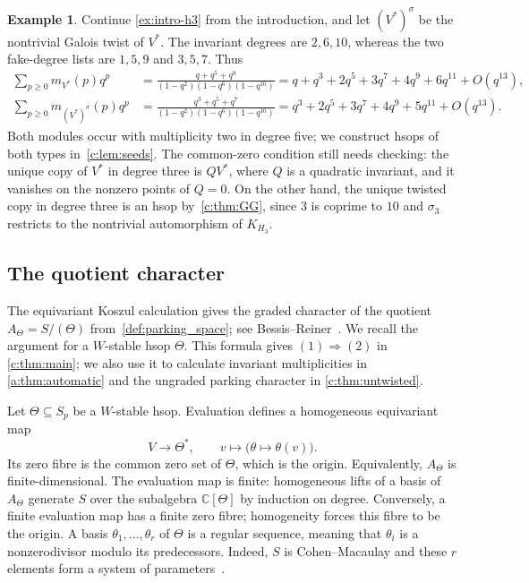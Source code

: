 \documentclass[10pt,a4paper]{amsart}
\theoremstyle{definition}
\newtheorem{example}[theorem]{Example}
\newcommand{\C}{\mathbb C}\newcommand{\Q}{\mathbb Q}
\begin{document}
\begin{example}\label{ex:h3-multiplicity}
Continue \cref{ex:intro-h3} from the introduction, and let
$(V^*)^\sigma$ be the nontrivial Galois twist of $V^*$. The invariant degrees are
$2,6,10$, whereas the two fake-degree lists are $1,5,9$ and $3,5,7$.
Thus
\begin{align*}
 \sum_{p\ge0}m_{V^*}(p)q^p
 &=\frac{q+q^5+q^9}{(1-q^2)(1-q^6)(1-q^{10})}
   =q+q^3+2q^5+3q^7+4q^9+6q^{11}+O(q^{13}),\\
 \sum_{p\ge0}m_{(V^*)^\sigma}(p)q^p
 &=\frac{q^3+q^5+q^7}{(1-q^2)(1-q^6)(1-q^{10})}
   =q^3+2q^5+3q^7+4q^9+5q^{11}+O(q^{13}).
\end{align*}
Both modules occur with multiplicity two in degree five; we construct
hsops of both types in~\cref{c:lem:seeds}. The common-zero condition
still needs checking: the unique copy of $V^*$ in degree three is
$QV^*$, where $Q$ is a quadratic invariant, and it vanishes on the
nonzero points of $Q=0$. On the other hand, the unique twisted copy in degree three is
an hsop by~\cref{c:thm:GG}, since $3$ is coprime to $10$ and
$\sigma_3$ restricts to the nontrivial automorphism of $K_{H_3}$.
\end{example}

\subsection{The quotient character}\label{b:sec:quotient-character}

The equivariant Koszul calculation gives the graded character
of the quotient $A_\Theta=S/(\Theta)$ from~\cref{def:parking_space}; see
Bessis--Reiner~\cite[Proposition~4.2 and its proof]{BR}.
We recall the argument for a $W$-stable hsop $\Theta$.
This formula gives
$(1)\Rightarrow(2)$ in \cref{c:thm:main}; we also use it to calculate
invariant multiplicities in \cref{a:thm:automatic} and the ungraded
parking character in \cref{c:thm:untwisted}.

Let $\Theta\subseteq S_p$ be a $W$-stable hsop. Evaluation defines a
homogeneous equivariant map
\[
 V\longrightarrow\Theta^*,\qquad
 v\longmapsto\bigl(\theta\longmapsto\theta(v)\bigr).
\]
Its zero fibre is the common zero set of $\Theta$, which is the
origin. Equivalently, $A_\Theta$ is finite-dimensional. The evaluation
map is finite: homogeneous lifts of a basis of $A_\Theta$ generate
$S$ over the subalgebra $\C[\Theta]$ by induction on degree.
Conversely, a finite evaluation map has a finite zero fibre; homogeneity
forces this fibre to be the origin.
A basis $\theta_1,\ldots,\theta_r$ of $\Theta$ is a regular sequence,
meaning that $\theta_i$ is a nonzerodivisor modulo its predecessors.
Indeed, $S$ is Cohen--Macaulay and these $r$ elements form a system
of parameters~\cite[Lemmas~10.104.2 and~10.104.7]{Stacks}.
\end{document}
